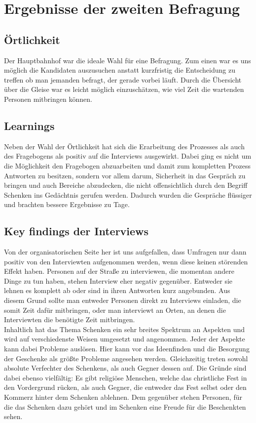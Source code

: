 \documentclass[12pt,ngerman, fleqn]{book} %
\begin{document}
\section{Ergebnisse der zweiten Befragung}
\subsection{Örtlichkeit}
Der Hauptbahnhof war die ideale Wahl für eine Befragung. Zum einen war es uns möglich die Kandidaten auszusuchen anstatt kurzfristig die Entscheidung zu treffen ob man jemanden befragt, der gerade vorbei läuft. Durch die Übersicht über die Gleise war es leicht möglich einzuschätzen, wie viel Zeit die wartenden Personen mitbringen können.

\subsection{Learnings}
Neben der Wahl der Örtlichkeit hat sich die Erarbeitung des Prozesses als auch des Fragebogens als positiv auf die Interviews ausgewirkt. Dabei ging es nicht um die Möglichkeit den Fragebogen abzuarbeiten und damit zum kompletten Prozess Antworten zu besitzen, sondern vor allem darum, Sicherheit in das Gespräch zu bringen und auch Bereiche abzudecken, die nicht offensichtlich durch den Begriff Schenken ins Gedächtnis gerufen werden. Dadurch wurden die Gespräche flüssiger und brachten bessere Ergebnisse zu Tage.

\subsection{Key findings der Interviews}
Von der organisatorischen Seite her ist uns aufgefallen, dass Umfragen nur dann positiv von den Interviewten aufgenommen werden, wenn diese keinen störenden Effekt haben. Personen auf der Straße zu interviewen, die momentan andere Dinge zu tun haben, stehen Interview eher negativ gegenüber. Entweder sie lehnen es komplett ab oder sind in ihren Antworten kurz angebunden. Aus diesem Grund sollte man entweder Personen direkt zu Interviews einladen, die somit Zeit dafür mitbringen, oder man interviewt an Orten, an denen die Interviewten die benötigte Zeit mitbringen.\\

Inhaltlich hat das Thema Schenken ein sehr breites Spektrum an Aspekten und wird auf verschiedenste Weisen umgesetzt und angenommen. Jeder der Aspekte kann dabei Probleme auslösen. Hier kann vor das Ideenfinden und die Besorgung der Geschenke als größte Probleme angesehen werden. Gleichzeitig treten sowohl absolute Verfechter des Schenkens, als auch Gegner dessen auf. Die Gründe sind dabei ebenso vielfältig: Es gibt religiöse Menschen, welche das christliche Fest in den Vordergrund rücken, als auch Gegner, die entweder das Fest selbst oder den Kommerz hinter dem Schenken ablehnen. Dem gegenüber stehen Personen, für die das Schenken dazu gehört und im Schenken eine Freude für die Beschenkten sehen.
\end{document}
